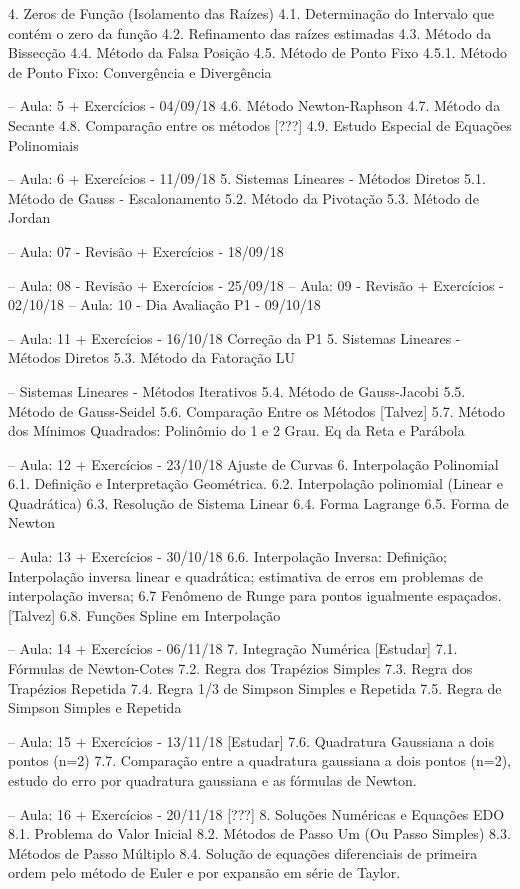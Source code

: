 4. Zeros de Função (Isolamento das Raízes)
4.1. Determinação do Intervalo que contém o zero da função
4.2. Refinamento das raízes estimadas
4.3. Método da Bissecção
4.4. Método da Falsa Posição
4.5. Método de Ponto Fixo
4.5.1. Método de Ponto Fixo: Convergência e Divergência

-- Aula: 5 + Exercícios - 04/09/18
4.6. Método Newton-Raphson
4.7. Método da Secante
4.8. Comparação entre os métodos
[???] 4.9. Estudo Especial de Equações Polinomiais

-- Aula: 6 + Exercícios - 11/09/18
5. Sistemas Lineares - Métodos Diretos
5.1. Método de Gauss - Escalonamento
5.2. Método da Pivotação
5.3. Método de Jordan

-- Aula: 07 - Revisão + Exercícios - 18/09/18

-- Aula: 08 - Revisão + Exercícios - 25/09/18
-- Aula: 09 - Revisão + Exercícios - 02/10/18
-- Aula: 10 - Dia Avaliação P1     - 09/10/18

-- Aula: 11 + Exercícios - 16/10/18
   Correção da P1
5. Sistemas Lineares - Métodos Diretos
5.3. Método da Fatoração LU

-- Sistemas Lineares - Métodos Iterativos
5.4. Método de Gauss-Jacobi
5.5. Método de Gauss-Seidel
5.6. Comparação Entre os Métodos
[Talvez] 5.7. Método dos Mínimos Quadrados: Polinômio do 1 e 2 Grau. Eq da Reta e Parábola

-- Aula: 12 + Exercícios - 23/10/18
Ajuste de Curvas
6. Interpolação Polinomial
6.1. Definição e Interpretação Geométrica. 
6.2. Interpolação polinomial (Linear e Quadrática)
6.3. Resolução de Sistema Linear
6.4. Forma Lagrange
6.5. Forma de Newton

-- Aula: 13 + Exercícios - 30/10/18
6.6. Interpolação Inversa: Definição; Interpolação inversa linear e quadrática; estimativa de erros em problemas de interpolação inversa; 
6.7 Fenômeno de Runge para pontos igualmente espaçados.
[Talvez] 6.8. Funções Spline em Interpolação 

-- Aula: 14 + Exercícios - 06/11/18
7. Integração Numérica
[Estudar] 7.1. Fórmulas de Newton-Cotes
7.2. Regra dos Trapézios Simples
7.3. Regra dos Trapézios Repetida
7.4. Regra 1/3 de Simpson Simples e Repetida
7.5. Regra de Simpson Simples e Repetida

-- Aula: 15 + Exercícios - 13/11/18
[Estudar] 7.6. Quadratura Gaussiana a dois pontos (n=2)
7.7. Comparação entre a quadratura gaussiana a dois pontos (n=2), estudo do erro por quadratura gaussiana e as fórmulas de Newton.

-- Aula: 16 + Exercícios - 20/11/18 
[???] 8. Soluções Numéricas e Equações EDO
8.1. Problema do Valor Inicial
8.2. Métodos de Passo Um (Ou Passo Simples)
8.3. Métodos de Passo Múltiplo
8.4. Solução de equações diferenciais de primeira ordem pelo método de Euler e por expansão em série de Taylor.

